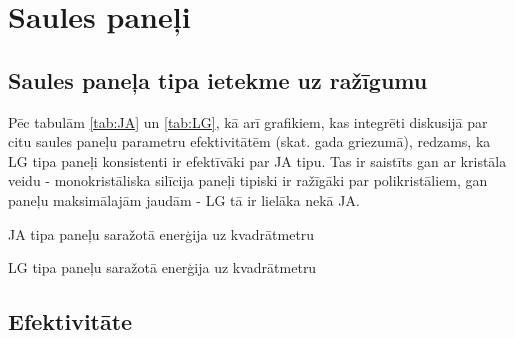 \section{Saules paneļi}
\subsection{Saules paneļa tipa ietekme uz ražīgumu}

Pēc tabulām \ref{tab:JA} un \ref{tab:LG}, kā arī grafikiem, kas integrēti diskusijā par citu saules paneļu parametru efektivitātēm (skat. gada griezumā), redzams, ka LG tipa paneļi konsistenti ir efektīvāki par JA tipu. Tas ir saistīts gan ar kristāla veidu - monokristāliska silīcija paneļi tipiski ir ražīgāki par polikristāliem, %
gan paneļu maksimālajām jaudām - LG tā ir lielāka nekā JA.

\begin{table}[h]
    \caption{JA tipa paneļu saražotā enerģija uz kvadrātmetru}
    \begin{center}
    
    \end{center}
    \label{tab:JA}
\end{table}
\begin{table}[h]
    \caption{LG tipa paneļu saražotā enerģija uz kvadrātmetru}
    \begin{center}
    
    \end{center}
    \label{tab:LG}
\end{table}


\subsection{Efektivitāte}


